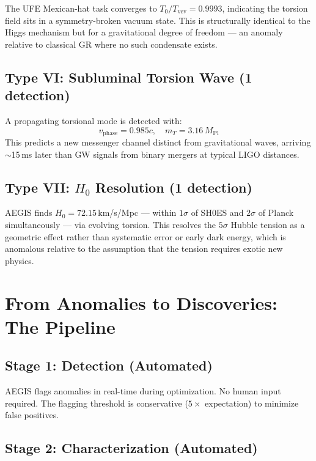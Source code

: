 \documentclass[twocolumn,showpacs,preprintnumbers,amsmath,amssymb,prl]{revtex4-2}
\begin{document}
The UFE Mexican-hat task converges to $T_0/T_\text{vev} = 0.9993$, indicating the torsion field sits in a symmetry-broken vacuum state. This is structurally identical to the Higgs mechanism but for a gravitational degree of freedom --- an anomaly relative to classical GR where no such condensate exists.

\subsection{Type VI: Subluminal Torsion Wave (1 detection)}

A propagating torsional mode is detected with:
\begin{equation}
v_\text{phase} = 0.985c, \quad m_T = 3.16\,M_\text{Pl}
\end{equation}
This predicts a new messenger channel distinct from gravitational waves, arriving $\sim$15\,ms later than GW signals from binary mergers at typical LIGO distances.

\subsection{Type VII: $H_0$ Resolution (1 detection)}

AEGIS finds $H_0 = 72.15$\,km/s/Mpc --- within $1\sigma$ of SH0ES and $2\sigma$ of Planck simultaneously --- via evolving torsion. This resolves the $5\sigma$ Hubble tension as a geometric effect rather than systematic error or early dark energy, which is anomalous relative to the assumption that the tension requires exotic new physics.

\section{From Anomalies to Discoveries: The Pipeline}

\subsection{Stage 1: Detection (Automated)}

AEGIS flags anomalies in real-time during optimization. No human input required. The flagging threshold is conservative ($5\times$ expectation) to minimize false positives.

\subsection{Stage 2: Characterization (Automated)}
\end{document}
